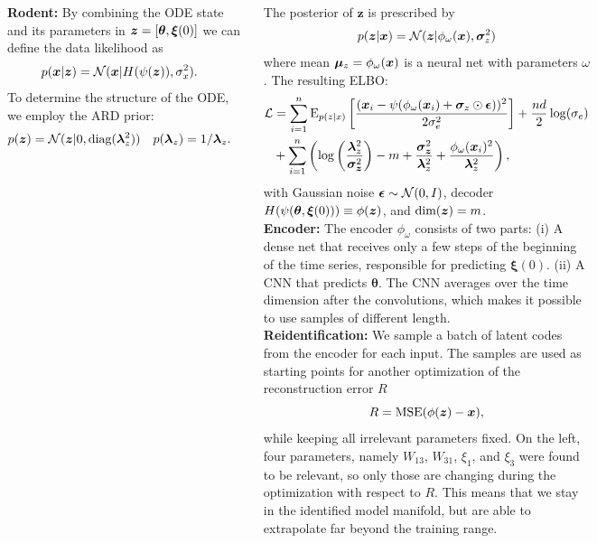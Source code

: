 \documentclass[25pt]{tikzposter}
\begin{document}
\begin{columns}
{    \textbf{Rodent:} By combining the ODE state and its parameters in
    $\bm{z}=[\bm\theta,\bm\xi(0)]$ we can define the data likelihood as
    \begin{align}
      \label{eq:decoder}
      p(\bm{x}|\bm{z}) &= \mathcal{N}(\bm{x}|H(\psi(\bm{z})),\sigma_x^2).
    \end{align}
    To determine the structure of the ODE, we employ the ARD prior:
    \begin{align}
      \label{eq:ard_model}
      p(\z) &= \N(\z|0,\text{diag}(\laz^2)) &
      p(\laz) &= 1/\laz.%
    \end{align}

    The posterior of $\bm z$ is prescribed by
    \begin{align}
      \label{eq:ard_posterior}
      p(\bm{z}|\bm{x}) = \mathcal{N}(\bm{z}|\phi_\omega(\bm{x}), \bm{\sigma}_z^2)
    \end{align}
    where mean $\bm{\mu}_{z}=\phi_\omega(\bm{x})$ is a neural net with parameters
    $\omega$.
    The resulting ELBO:
    {\fontsize{25}{20}
    \begin{equation}
    \begin{aligned}
      \label{eq:elbo_reparam}
      \mathcal{L} &= \sum_{i=1}^n \text{E}_{p(z|x)}\left[\frac{(\bm{x}_i - \psi(\phi_\omega(\bm{x}_i) + \bm{\sigma}_z \odot \bm{\epsilon}))^2}{2\sigma_e^2}\right]
                  + \frac{nd}{2}\log(\sigma_e) \\
                  &+ \sum_{i=1}^n \left(
                      \log\left(\frac{\bm{\lambda}_z^2}{\bm{\sigma_z}^2}\right)
                      -m + \frac{\bm{\sigma_z}^2}{\bm{\lambda}_z^2} + \frac{\phi_\omega(\bm{x}_i)^2}{\bm{\lambda}_z^2}
                  \right),
    \end{aligned}
    \end{equation}}
    with Gaussian noise $\bm{\epsilon} \sim \mathcal{N}(0,I)$, decoder
    $H(\psi(\bm\theta,\bm\xi(0)))\equiv\phi(\bm{z})$, and $\text{dim}(\bm{z}) = m$.\\

    \textbf{Encoder:} The encoder $\phi_\omega$ consists of two parts: (i) A
    dense net that receives only a few steps of the beginning of the time
    series, responsible for predicting $\bm \xi(0)$. (ii) A CNN that predicts
    $\bm \theta$.  The CNN averages over the time dimension after the
    convolutions, which makes it possible to use samples of different length.\\

    \textbf{Reidentification:} We sample a batch of
    latent codes from the encoder for each input.  The samples
    are used as starting points for another optimization of the reconstruction
    error $R$
    \begin{equation}
      R = \mathrm{MSE}(\phi(\bm z) - \bm{x}),
    \end{equation}
    while keeping all irrelevant parameters fixed.
    On the left, four parameters, namely $W_{13}$,
    $W_{31}$, $\xi_{1}$, and $\xi_{3}$ were found to be relevant, so only
    those are changing during the optimization with respect to $R$.
    This means that we stay in the identified model manifold, but are able to
    extrapolate far beyond the training range.   

    \vspace{5.20cm}
  }
  
\end{columns}
\end{document}
